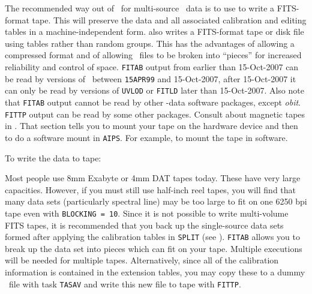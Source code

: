 
     The recommended way out of \AIPS\ for multi-source \uv\ data is
to use {\tt {}} to write a FITS-format tape.  This will
preserve the data and all associated calibration and editing tables in
a machine-independent form.  {\tt {}} also writes a
FITS-format tape or disk file using tables rather than random groups.
This has the advantages of allowing a compressed format and of allowing
\uv\ files to be broken into ``pieces'' for increased reliability and
control of space.  {\tt FITAB} output from earlier than 15-Oct-2007
can be read by versions of \AIPS\ between {\tt 15APR99} and 15-Oct-2007,
after 15-Oct-2007 it can only be read by versions of {\tt UVLOD} or
{\tt FITLD} later than 15-Oct-2007.  Also note that {\tt FITAB} output
cannot be read by other \uv-data software packages, except {\it obit}.
{\tt FITTP} output can be read by some other packages.  Consult
 about magnetic tapes in \hbox{\AIPS}.  That section
tells you to mount your tape on the hardware device and then to do a
software mount in \hbox{{\tt AIPS}}.  For example,
 {to mount the tape in software.}

      To write the data to tape:

     Most people use 8mm Exabyte or 4mm DAT tapes today.  These have
very large capacities.  However, if you must still use half-inch reel
tapes, you will find that many data sets (particularly spectral line)
may be too large to fit on one 6250 bpi tape even with {\tt BLOCKING =
10}.  Since it is not possible to write multi-volume FITS tapes, it is
recommended that you back up the single-source data sets formed after
applying the calibration tables in {\tt SPLIT} (see ).
{\tt FITAB} allows you to break up the data set into pieces which can
fit on your tape.  Multiple executions will be needed for multiple
tapes.  Alternatively, since all of the calibration information is
contained in the extension tables, you may copy these to a dummy \uv\
file with task {\tt TASAV} and write this new file to tape with
\hbox{{\tt FITTP}}.

